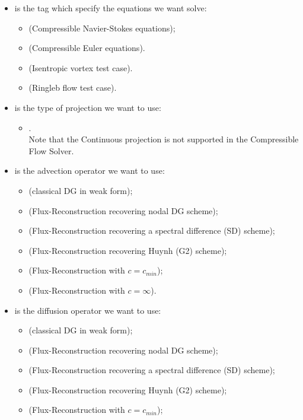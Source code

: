 \begin{itemize}
\item {} is the tag which specify the equations we want solve:
\begin{itemize}
\item {} (Compressible Navier-Stokes equations);
\item {} (Compressible Euler equations).
\item {} (Isentropic vortex test case).
\item {} (Ringleb flow test case).
\end{itemize}
\item {} is the type of projection we want to use:
\begin{itemize}
\item {}.\\
Note that the Continuous projection is not supported in the Compressible Flow Solver. 
\end{itemize}
\item {} is the advection operator we want to use:
\begin{itemize}
\item {} (classical DG in weak form);
\item {} (Flux-Reconstruction recovering nodal DG scheme);
\item {} (Flux-Reconstruction recovering a spectral difference (SD) scheme);
\item {} (Flux-Reconstruction recovering Huynh (G2) scheme);
\item {} (Flux-Reconstruction with $c = c_{min}$);
\item {} (Flux-Reconstruction with $c = \infty$).
\end{itemize}
\item {} is the diffusion operator we want to use:
\begin{itemize}
\item {} (classical DG in weak form);
\item {} (Flux-Reconstruction recovering nodal DG scheme);
\item {} (Flux-Reconstruction recovering a spectral difference (SD) scheme);
\item {} (Flux-Reconstruction recovering Huynh (G2) scheme);
\item {} (Flux-Reconstruction with $c = c_{min}$);

\end{itemize}
\end{itemize}
